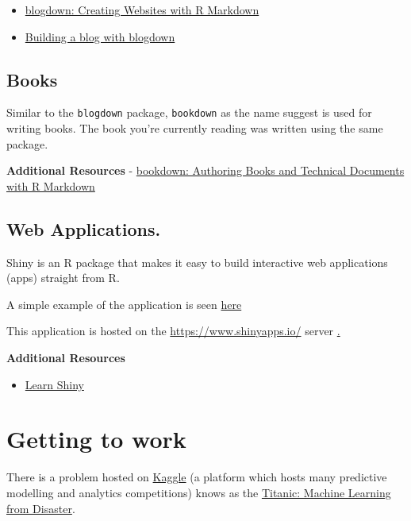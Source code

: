 \documentclass[]{book}
\providecommand{\tightlist}{%
  \setlength{\itemsep}{0pt}\setlength{\parskip}{0pt}}
\theoremstyle{definition}
\theoremstyle{definition}
\theoremstyle{definition}
\theoremstyle{remark}
\begin{document}
\begin{itemize}
\tightlist
\item
  \href{https://bookdown.org/yihui/blogdown/}{blogdown: Creating
  Websites with R Markdown}
\item
  \href{https://tclavelle.github.io/blog/blogdown_github/}{Building a
  blog with blogdown}
\end{itemize}

\section{Books}\label{books}

Similar to the \texttt{blogdown} package, \texttt{bookdown} as the name
suggest is used for writing books. The book you're currently reading was
written using the same package.

\textbf{Additional Resources} -
\href{https://bookdown.org/yihui/bookdown/}{bookdown: Authoring Books
and Technical Documents with R Markdown}

\section{Web Applications.}\label{web-applications.}

Shiny is an R package that makes it easy to build interactive web
applications (apps) straight from R.

A simple example of the application is seen
\href{https://gauravsatav.shinyapps.io/WebApp/}{here}

This application is hosted on the \url{https://www.shinyapps.io/} server
\href{https://www.shinyapps.io/admin/\#/application/239302}{.}

\textbf{Additional Resources}

\begin{itemize}
\tightlist
\item
  \href{https://shiny.rstudio.com/tutorial/}{Learn Shiny}
\end{itemize}

\chapter{Getting to work}\label{getting-to-work}

There is a problem hosted on \href{https://www.kaggle.com/}{Kaggle} (a
platform which hosts many predictive modelling and analytics
competitions) knows as the
\href{https://www.kaggle.com/c/titanic}{Titanic: Machine Learning from
Disaster}.
\end{document}
